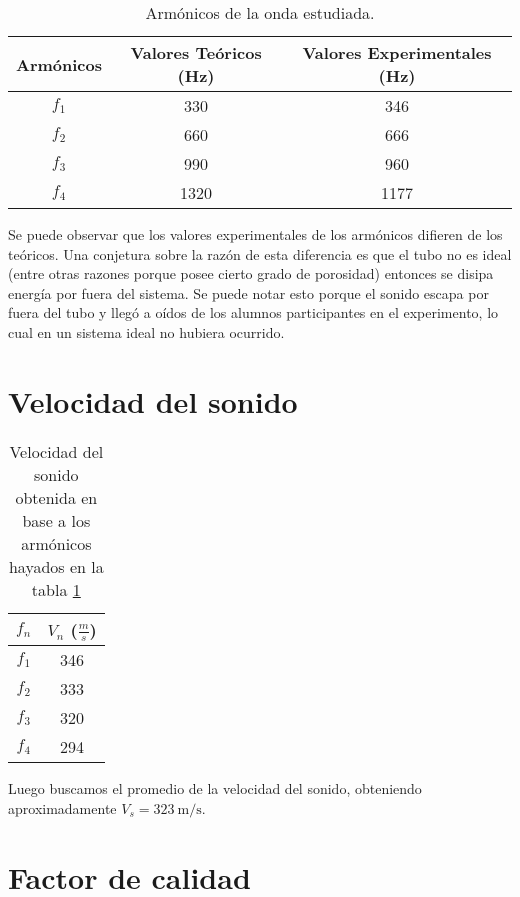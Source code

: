 \documentclass[12pt,a4paper]{article}
\begin{document}
\begin{table}[H]
    \centering
    \begin{tabular}{|c|c|c|}
    \hline
    \multirow{2}{2.1cm}{ Armónicos }
        & Valores Teóricos (Hz) & Valores Experimentales (Hz)\\
    \hline
    $f_1$  & 330  & 346 \\ \hline
    $f_2$  & 660 & 666 \\ \hline
    $f_3$  & 990 & 960 \\ \hline
    $f_4$  & 1320  & 1177 \\ \hline
    \end{tabular}
    \caption{Armónicos de la onda estudiada.}
    \label{tabla1}
\end{table}
Se puede observar que los valores experimentales de los armónicos difieren de los teóricos. Una conjetura sobre la razón de esta diferencia es que el tubo no es ideal (entre otras razones porque posee cierto grado de porosidad) entonces se disipa energía por fuera del sistema. Se puede notar esto porque el sonido escapa por fuera del tubo y llegó a oídos de los alumnos participantes en el experimento, lo cual en un sistema ideal no hubiera ocurrido.


\section{Velocidad del sonido}

\begin{table}[H]
    \centering
    \begin{tabular}{|c|c|}
    \hline
    \multirow{1}{2.1cm}{\centering $f_n$} 
        & $V_n$ ($\frac{m}{s}$) \\
    \hline
    $f_1$  & 346 \\ \hline
    $f_2$  & 333 \\ \hline
    $f_3$  & 320 \\ \hline
    $f_4$  & 294  \\ \hline
    \end{tabular}
    \caption{Velocidad del sonido obtenida en base a los armónicos hayados en la tabla \ref{tabla1}}
    \label{tabla2}
\end{table}

Luego buscamos el promedio de la velocidad del sonido, obteniendo aproximadamente $V_s = 323 \ \mathrm{m/s}$.
\section{Factor de calidad}
\end{document}
